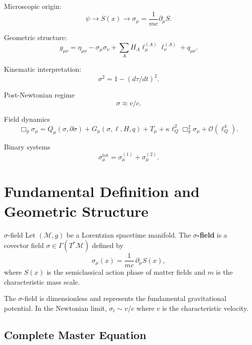 \documentclass[11pt,a4paper]{article}
\theoremstyle{definition}
\theoremstyle{remark}
\begin{document}
		Microscopic origin:
		\begin{equation}
			\psi \rightarrow S(x) \rightarrow \sigma_\mu = \frac{1}{mc}\partial_\mu S.
		\end{equation}
		
		Geometric structure:
		\begin{equation}
			g_{\mu\nu} = \eta_{\mu\nu} - \sigma_\mu\sigma_\nu + \sum_A H_A \ell_\mu^{(A)} \ell_\nu^{(A)} + q_{\mu\nu}.
		\end{equation}
		
		Kinematic interpretation:
		\begin{equation}
			\sigma^2 = 1 - (d\tau/dt)^2.
		\end{equation}
		
		Post-Newtonian regime
		\begin{equation}
			\sigma \approx v/c.
		\end{equation}
		
		Field dynamics
		\begin{equation}
			\Box_g \sigma_\mu = Q_\mu(\sigma, \partial\sigma) + G_\mu(\sigma, \ell, H, q) + T_\mu + \kappa\ell_Q^2 \Box_g^2 \sigma_\mu + \mathcal{O}(\ell_Q^4).
		\end{equation}
		
		Binary systems
		\begin{equation}
			\sigma_\mu^{\text{tot}} = \sigma_\mu^{(1)} + \sigma_\mu^{(2)}.
		\end{equation}

		
		\section{Fundamental Definition and Geometric Structure}
		
		$\sigma$-field
			Let $(\mathcal{M}, g)$ be a Lorentzian spacetime manifold. The \textbf{$\sigma$-field} is a covector field $\sigma \in \Gamma(T^*\mathcal{M})$ defined by
			\begin{equation}
				\sigma_\mu(x) = \frac{1}{mc} \, \partial_\mu S(x),
			\end{equation}
			where $S(x)$ is the semiclassical action phase of matter fields and $m$ is the characteristic mass scale.
		
			The $\sigma$-field is dimensionless and represents the fundamental gravitational potential. In the Newtonian limit, $\sigma_t \sim v/c$ where $v$ is the characteristic velocity.
		
		\subsection{Complete Master Equation}
		
\end{document}

